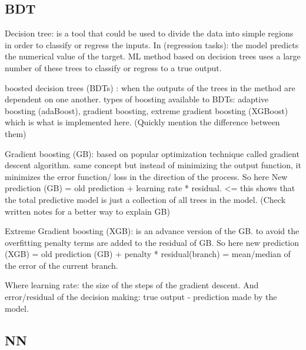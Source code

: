 \subsection{BDT}

Decision tree: is a tool that could be used to divide the data into simple regions in order to classify or regress the inputs. In (regression tasks): the model predicts the numerical value of the target. ML method based on decision trees uses a large number of these trees to classify or regress to a true output.

boosted decision trees (BDTs) : when the outputs of the trees in the method are dependent on one another.  types of boosting available to BDTs: adaptive boosting (adaBoost), gradient boosting, extreme gradient boosting (XGBoost) which is what is implemented here. (Quickly mention the difference between them)

Gradient boosting (GB): based on popular optimization technique called gradient descent algorithm. same concept but instead of minimizing the output function, it minimizes the error function/ loss in the direction of the process. So here New prediction (GB) = old prediction + learning rate * residual. <= this shows that the total predictive model is just a collection of all trees in the model. (Check written notes for a better way to explain GB)

Extreme Gradient boosting (XGB): is an advance version of the GB. to avoid the overfitting penalty terms are added to the residual of GB. So here new prediction (XGB) = old prediction (GB) + penalty * residual(branch) = mean/median of the error of the current branch.

Where learning rate: the size of the steps of the gradient descent. And error/residual of the decision making: true output - prediction made by the model. 


\subsection{NN} 



